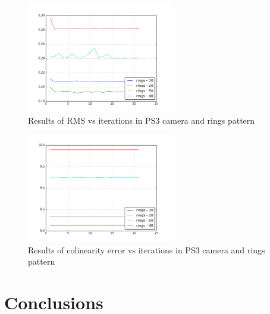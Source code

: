 \documentclass[journal]{IEEEtran}
\begin{document}
\begin{figure}[H]
\centering
\includegraphics[width=2.5in]{_img/report_4/img_results_ps3_rings.png}
\caption{Results of RMS vs iterations in PS3 camera and rings pattern}
\end{figure}

\begin{figure}[H]
\centering
\includegraphics[width=2.5in]{_img/report_4/img_results_ps3_colinearity_rings.png}
\caption{Results of colinearity error vs iterations in PS3 camera and rings pattern}
\end{figure}


\section{Conclusions}
\end{document}
